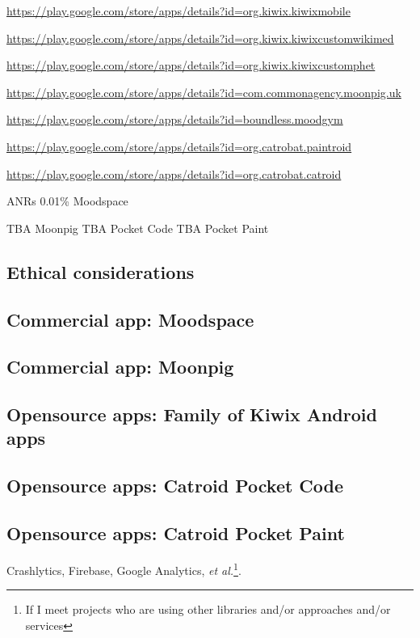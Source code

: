 \begin{table}
\begin{threeparttable}[b]
\begin{tablenotes}
\footnotesize
\item [1]\url{https://play.google.com/store/apps/details?id=org.kiwix.kiwixmobile}
\item [2]\url{https://play.google.com/store/apps/details?id=org.kiwix.kiwixcustomwikimed}
\item [3]\url{https://play.google.com/store/apps/details?id=org.kiwix.kiwixcustomphet}
\item [4]\url{https://play.google.com/store/apps/details?id=com.commonagency.moonpig.uk}
\item [5]\url{https://play.google.com/store/apps/details?id=boundless.moodgym}
\item[6]\url{https://play.google.com/store/apps/details?id=org.catrobat.paintroid}
\item[7]\url{https://play.google.com/store/apps/details?id=org.catrobat.catroid}
\end{tablenotes}
\end{threeparttable}
\end{table}

ANRs 
0.01\% Moodspace

TBA Moonpig
TBA Pocket Code
TBA Pocket Paint

\subsection{Ethical considerations}

\subsection{Commercial app: Moodspace}
\subsection{Commercial app: Moonpig}
\subsection{Opensource apps: Family of Kiwix Android apps}
\subsection{Opensource apps: Catroid Pocket Code}
\subsection{Opensource apps: Catroid Pocket Paint}


Crashlytics, Firebase, Google Analytics, \textit{et al.}\footnote{If I meet projects who are using other libraries and/or approaches and/or services}.


